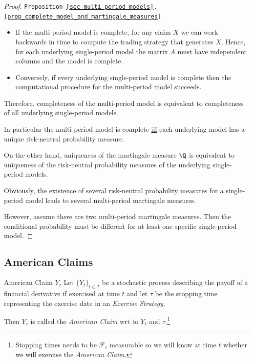 \documentclass[11pt,a4paper]{article}
\begin{document}
  \begin{proof}{\texttt{Proposition \ref{sec_multi_period_models}.\ref{prop_complete_model_and_martingale_measures}}}
    \begin{itemize}
      \item If the multi-period model is complete, for any claim $X$ we can work backwards in time to compute the trading strategy that generates $X$. Hence, for each underlying single-period model the matrix $A$ must have independent columns and the model is complete.
      \item Conversely, if every underlying single-period model is complete then the computational procedure for the multi-period model succeeds.
    \end{itemize}
    Therefore, completeness of the multi-period model is equivalent to completeness of all underlying single-period models.
    \par In particular the multi-period model is complete \underline{iff} each underlying model has a unique risk-neutral probability measure.
    \par On the other hand, uniqueness of the martingale measure $\Q$ is equivalent to uniqueness of the risk-neutral probability measures of the underlying single-period models.
    \par Obviously, the existence of several risk-neutral probability measures for a single-period model leads to several multi-period martingale measures.
    \par However, assume there are two multi-period martingale measures. Then the conditional probability must be different for at least one specific single-period model.\proved
  \end{proof}

\subsection{American Claims}

  \begin{definition}{American Claim $Y_\tau$}
    Let $\{Y_t\}_{t\in T}$ be a stochastic process describing the payoff of a financial derivative if exercised at time $t$ and let $\tau$ be the stopping time representing the exercise date in an \textit{Exercise Strategy}.
    \par Then $Y_\tau$ is called the \textit{American Claim} wrt to $Y_t$ and $\tau$.\footnote{Stopping times needs to be $\mathcal{F}_t$ measurable so we will know at time $t$ whether we will exercise the \textit{American Claim}.}
  \end{definition}
\end{document}
